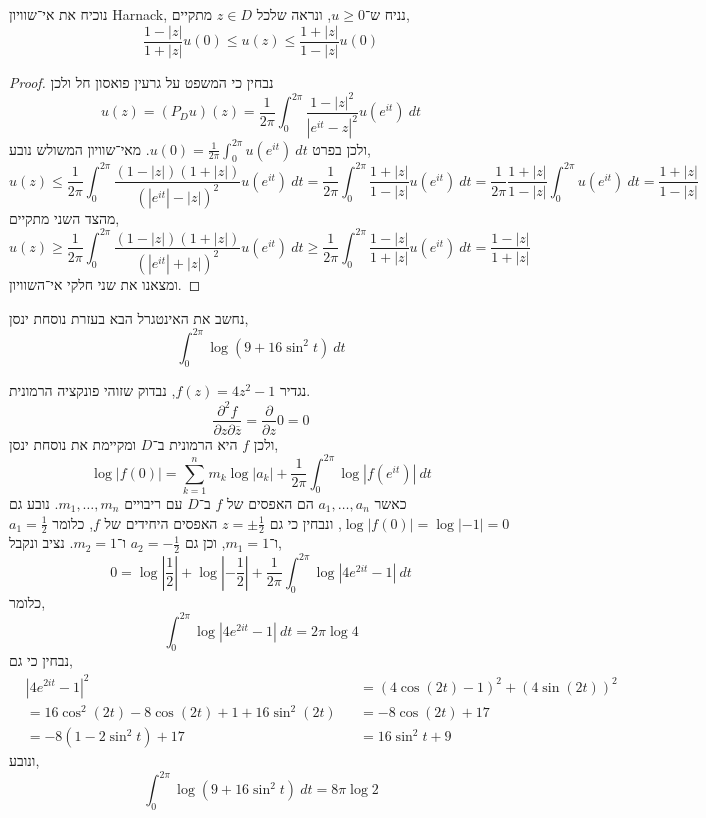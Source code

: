 \subquestion{}
נוכיח את אי־שוויון Harnack,
נניח ש־$u \ge 0$, ונראה שלכל $z \in D$ מתקיים,
\[
	\frac{1 - |z|}{1 + |z|} u(0) \le u(z) \le \frac{1 + |z|}{1 - |z|} u(0)
\]
\begin{proof}
	נבחין כי המשפט על גרעין פואסון חל ולכן
	\[
		u(z)
		= (P_D u)(z)
		= \frac{1}{2\pi} \int_0^{2\pi} \frac{1 - |z|^2}{{|e^{it} - z|}^2} u(e^{it})\ dt
	\]
	ולכן בפרט $u(0) = \frac{1}{2\pi} \int_0^{2\pi} u(e^{it})\ dt$.
	מאי־שוויון המשולש נובע,
	\[
		u(z)
		\le \frac{1}{2\pi} \int_0^{2\pi} \frac{(1 - |z|)(1 + |z|)}{{(|e^{it}| - |z|)}^2} u(e^{it})\ dt
		= \frac{1}{2\pi} \int_0^{2\pi} \frac{1 + |z|}{1 - |z|} u(e^{it})\ dt
		= \frac{1}{2\pi} \frac{1 + |z|}{1 - |z|} \int_0^{2\pi} u(e^{it})\ dt
		= \frac{1 + |z|}{1 - |z|}
	\]
	מהצד השני מתקיים,
	\[
		u(z)
		\ge \frac{1}{2\pi} \int_0^{2\pi} \frac{(1 - |z|)(1 + |z|)}{{(|e^{it}| + |z|)}^2} u(e^{it})\ dt
		\ge \frac{1}{2\pi} \int_0^{2\pi} \frac{1 - |z|}{1 + |z|} u(e^{it})\ dt
		= \frac{1 - |z|}{1 + |z|}
	\]
	ומצאנו את שני חלקי אי־השוויון.
\end{proof}

\question{}
נחשב את האינטגרל הבא בעזרת  נוסחת ינסן,
\[
	\int_0^{2\pi} \log(9 + 16 \sin^2 t)\ dt
\]
\begin{solution}
	נגדיר $f(z) = 4z^2 - 1$, נבדוק שזוהי פונקציה הרמונית.
	\[
		\frac{\partial^2 f}{\partial z \partial \overline{z}}
		= \frac{\partial}{\partial z} 0
		= 0
	\]
	ולכן $f$ היא הרמונית ב־$D$ ומקיימת את נוסחת ינסן,
	\[
		\log |f(0)|
		= \sum_{k = 1}^{n} m_k \log |a_k| + \frac{1}{2\pi} \int_0^{2\pi} \log |f(e^{it})|\ dt
	\]
	כאשר $a_1, \dots, a_n$ הם האפסים של $f$ ב־$D$ עם ריבויים $m_1, \dots, m_n$.
	נובע גם $\log |f(0)| = \log |-1| = 0$, ונבחין כי גם $z = \pm \frac{1}{2}$ האפסים היחידים של $f$, כלומר $a_1 = \frac{1}{2}$ ו־$m_1 = 1$, וכן גם $a_2 = -\frac{1}{2}$ ו־$m_2 = 1$.
	נציב ונקבל,
	\[
		0 = \log \left\lvert \frac{1}{2} \right\rvert + \log \left\lvert -\frac{1}{2} \right\rvert + \frac{1}{2\pi} \int_0^{2\pi} \log |4e^{2it} - 1|\ dt
	\]
	כלומר,
	\[
		\int_0^{2\pi} \log |4 e^{2it} - 1|\ dt = 2\pi \log 4
	\]
	נבחין כי גם,
	\begin{align*}
		& {|4 e^{2it} - 1|}^2
		&& = {(4 \cos(2t) - 1)}^2 + {(4\sin(2t))}^2 \\
		& = 16 \cos^2(2t) - 8 \cos(2t) + 1 + 16 \sin^2(2t)
		&& = -8 \cos(2t) + 17 \\
		& = -8 (1 - 2\sin^2 t) + 17
		&& = 16 \sin^2 t + 9
	\end{align*}
	ונובע,
	\[
		\int_0^{2\pi} \log(9 + 16\sin^2 t)\ dt = 8\pi \log 2
	\]
\end{solution}

